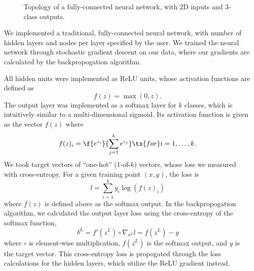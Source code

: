 \documentclass{article}
\begin{document}
\begin{multicols}{2}
\begin{figure}[t]
    \caption{Topology of a fully-connected neural network, with 2D inputs and 3-class outputs.}
\end{figure}

We implemented a traditional, fully-connected neural network,
with number of hidden layers and nodes per layer specified by the user.
We trained the neural network
through stochastic gradient descent on our data,
where our gradients are calculated by the
backpropogation algorithm.

All hidden units were implemented as ReLU units,
whose activation functions are defined as
\begin{equation}
    f(z) = \max(0, z).
\end{equation}
The output layer was implemented as a softmax layer for $k$ classes,
which is intuitively similar to a multi-dimensional sigmoid.  %
Its activation function is given as the vector $f(z)$ where
\begin{equation}
    f(z)_i = \f{e^{z_i}}{\sum_{j=1}^{k}{e^{z_j}}} \tx{ for } i = 1,\dots,k.
\end{equation}
We took target vectors of ``one-hot'' (1-of-$k$) vectors,
whose loss we measured with cross-entropy.
For a given training point $(x,y)$, the loss is
\begin{equation}
    l = \sum_{i = 1}^k{y_i \log(f(z)_i)}
\end{equation}
where $f(z)$ is defined above as the softmax output.
In the backpropogation algorithm,
we calculated the output layer loss using
the cross-entropy of the softmax function,
\begin{equation}
    \delta^L = f'(z^L)\circ\nabla_{a^L}l = f(z^L) - y
\end{equation}
where $\circ$ is element-wise multiplication, $f(z^L)$ is the softmax output,
and $y$ is the target vector.
This cross-entropy loss is propogated through the 
loss calculations for the hidden layers,
which utilize the ReLU gradient instead.


\end{multicols}
\end{document}

